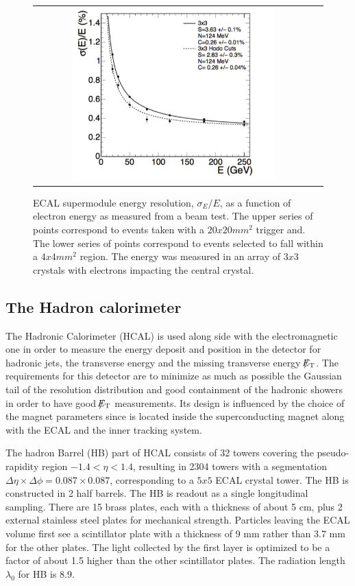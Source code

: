 \begin{figure}[tbh!]
	\centering
	\begin{tabular}{cc}
		\includegraphics[width=0.75\textwidth]{detector/pics/ECAL_resolution.pdf}
	\end{tabular}
	\caption{ECAL supermodule energy resolution, $\sigma_{E}/E$, as a function of electron energy as measured from a beam test. The upper series of points correspond to events taken with a $20x20 mm^{2}$ trigger and. The lower series of points correspond to events selected to fall within a $4x4 mm^{2}$ region. The energy was measured in an array of $3x3$ crystals with electrons impacting the central crystal.}
	\label{fig:ECAL_resolution}
\end{figure}

\clearpage

\subsection{The Hadron calorimeter}

The Hadronic Calorimeter (HCAL) is used along side with the electromagnetic one in order to measure the energy deposit and position in the detector for hadronic jets, the transverse energy and the missing transverse energy $\slash\mkern-12mu{E}_{\text{T}}$. The requirements for this detector are to minimize as much as possible the Gaussian tail of the resolution distribution and good containment of the hadronic showers in order to have good $\slash\mkern-12mu{E}_{\text{T}}$ measurements. Its design is influenced by the choice of the magnet parameters since is located inside the superconducting magnet along with the ECAL and the inner tracking system. 

The hadron Barrel (HB) part of HCAL consists of 32 towers covering the pseudo-rapidity region $−1.4 < \eta < 1.4$, resulting in 2304 towers with a segmentation $\Delta\eta\times\Delta\phi = 0.087\times0.087$, corresponding to a $5x5$ ECAL crystal tower. The HB is constructed in 2 half barrels. The HB is readout as a single longitudinal sampling. There are 15 brass plates, each with a thickness of about 5 cm, plus 2 external stainless steel plates for mechanical strength. Particles leaving the ECAL volume ﬁrst see a scintillator plate with a thickness of 9 mm rather than 3.7 mm for the other plates. The light collected by the ﬁrst layer is optimized to be a factor of about 1.5 higher than the other scintillator plates. The radiation length $\lambda_{0}$ for HB is $8.9$.

